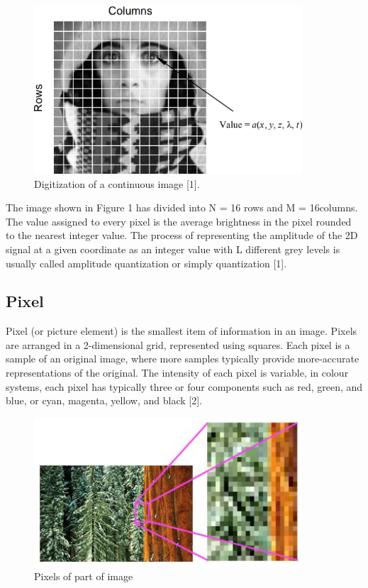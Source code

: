         \begin{figure}[h]
                \centering
                \includegraphics[width=10cm]{chapiter1/figures/degital-image.png}
                \setlength{\fboxrule}{2pt}
                \caption{Digitization of a continuous image [1].}
        \end{figure}

The image shown in Figure 1 has divided into N = 16 rows and M = 16columns.
The value assigned to every pixel is the average brightness in the pixel rounded to the nearest integer value.
The process of representing the amplitude of the 2D signal at a given coordinate as an integer value with L different grey levels is usually called amplitude quantization or simply quantization [1].

\subsection{Pixel}\label{subsec:pixel}

Pixel (or picture element) is the smallest item of information in an image.
Pixels are arranged in a 2-dimensional grid, represented using squares.
Each pixel is a sample of an original image, where more samples typically provide more-accurate representations of the original.
The intensity of each pixel is variable, in colour systems, each pixel has typically three or four components such as red, green, and blue, or cyan, magenta, yellow, and black [2].

        \begin{figure}[h]
                \centering
                \includegraphics[width=10cm]{chapiter1/figures/pixel.png}
                \setlength{\fboxrule}{2pt}
                \caption{Pixels of part of image}
        \end{figure}

